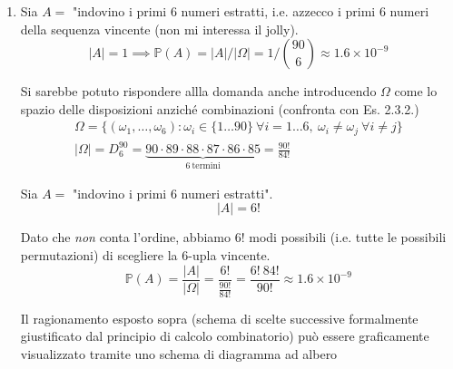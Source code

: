 \begin{enumerate}
\item Sia $A=$ "indovino i primi $6$ numeri estratti, i.e. azzecco i primi $6$ numeri della sequenza vincente (non mi interessa il jolly).\begin{equation*}
| A| =1\mathbb{\implies P}( A) =| A| /| \Omega | =1/\binom{90}{6} \approx 1.6\times 10^{-9}
\end{equation*}

\begin{oss}
Si sarebbe potuto rispondere allla domanda anche introducendo $\Omega $ come lo spazio delle disposizioni anziché combinazioni (confronta con Es. 2.3.2.)\begin{gather*}
\Omega =\{( \omega _{1} ,\dotsc ,\omega _{6}) :\omega _{i} \in \{1\dotsc 90\} \ \forall i=1\dotsc 6,\ \omega _{i} \neq \omega _{j} \ \forall i\neq j\}\\
| \Omega | =D_{6}^{90} =\underbrace{90\cdot 89\cdot 88\cdot 87\cdot 86\cdot 85}_{6\ \text{termini}} =\frac{90!}{84!}
\end{gather*}
\end{oss}

Sia $A=$ "indovino i primi $6$ numeri estratti".\begin{equation*}
| A| =6!
\end{equation*}

Dato che \textit{non} conta l'ordine, abbiamo $6!$ modi possibili (i.e. tutte le possibili permutazioni) di scegliere la $6$-upla vincente.\begin{equation*}
\mathbb{P}( A) =\frac{| A| }{| \Omega | } =\frac{6!}{\frac{90!}{84!}} =\frac{6!\ 84!}{90!} \approx 1.6\times 10^{-9}
\end{equation*}

Il ragionamento esposto sopra (schema di scelte successive formalmente giustificato dal principio di calcolo combinatorio) può essere graficamente visualizzato tramite uno schema di diagramma ad albero


\begin{tikzpicture}[x=0.75pt,y=0.75pt,yscale=-1,xscale=1]


\end{tikzpicture}
\end{enumerate}
